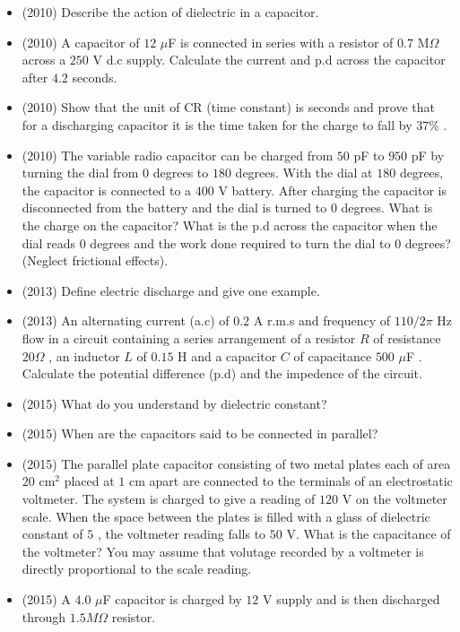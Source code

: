 \documentclass{article}
\begin{document}
\begin{itemize}
\item (2010)  Describe the action of dielectric in a capacitor.
\item (2010)  A capacitor of $ 12$ $\mu$F is connected in series with a resistor of $ 0.7$ M$ \Omega $ across a $ 250$ V d.c supply. Calculate the current and p.d across the capacitor after $ 4.2$ seconds.
\item (2010)  Show that the unit of CR (time constant) is seconds and prove that for a discharging capacitor it is the time taken for the charge to fall by $ 37\%$ . 
\item (2010)  The variable radio capacitor can be charged from $ 50$ pF to $ 950$ pF by turning the dial from $ 0$ degrees to $ 180$ degrees. With the dial at $ 180$ degrees, the capacitor is connected to a $ 400$ V battery. After charging the capacitor is disconnected from the battery and the dial is turned to $ 0$ degrees. What is the charge on the capacitor? What is the p.d across the capacitor when the dial reads $ 0$ degrees and the work done required to turn the dial to $ 0$ degrees? (Neglect frictional effects).
\item (2013)  Define electric discharge and give one example.
\item (2013)  An alternating current (a.c) of $ 0.2$ A r.m.s and frequency of $ 110/2\pi$ Hz flow in a circuit containing a series arrangement of a resistor $ R$ of resistance $ 20\Omega$ , an inductor $ L$ of $ 0.15$ H and a capacitor $ C$ of capacitance $ 500$ $\mu$F . Calculate the potential difference (p.d) and the impedence of the circuit.
\item (2015)  What do you understand by dielectric constant?
\item (2015)  When are the capacitors said to be connected in parallel?
\item (2015)  The parallel plate capacitor consisting of two metal plates each of area $ 20$ cm$ ^{2}$ placed at $ 1$ cm apart are connected to the terminals of an electrostatic voltmeter.  The system is charged to give a reading of $ 120$ V on the voltmeter scale.  When the space between the plates is filled with a glass of dielectric constant of $ 5$ , the voltmeter reading falls to $ 50$ V.  What is the capacitance of the voltmeter?  You may assume that volutage recorded by a voltmeter is directly proportional to the scale reading.
\item (2015)  A $ 4.0$ $\mu$F capacitor is charged by $ 12$ V supply and is then discharged through $ 1.5M\Omega $ resistor.  
 \begin{itemize}

\end{itemize}
\end{itemize}
\end{document}
